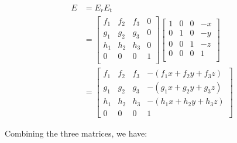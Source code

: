 \documentclass{article}
\begin{document}
\begin{align}
E &= E_r E_t \\
  &= \begin{bmatrix}
f_1 & f_2 & f_3 & 0 \\
g_1 & g_2 & g_3 & 0 \\
h_1 & h_2 & h_3 & 0 \\
  0 &   0 &   0 & 1 \\
\end{bmatrix} \begin{bmatrix}
1 & 0 & 0 & -x \\
0 & 1 & 0 & -y \\
0 & 0 & 1 & -z \\
0 & 0 & 0 &  1 \\
\end{bmatrix} \\
  &= \begin{bmatrix}
f_1 & f_2 & f_3 & -(f_1 x + f_2 y + f_3 z) \\
g_1 & g_2 & g_3 & -(g_1 x + g_2 y + g_3 z) \\
h_1 & h_2 & h_3 & -(h_1 x + h_2 y + h_3 z) \\
  0 &   0 &   0 &                        1
\end{bmatrix}
\end{align}

Combining the three matrices, we have:
\end{document}
